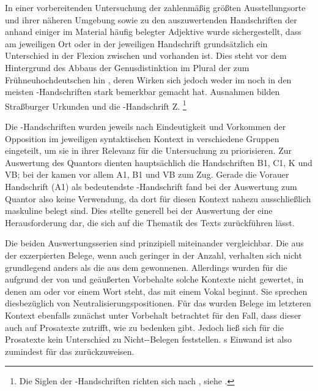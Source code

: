 In einer vorbereitenden Untersuchung der zahlenmäßig größten Ausstellungs\-orte
und ihrer näheren Umgebung sowie zu den auszuwertenden Handschriften der
\KC{} anhand einiger im Material häufig belegter Adjektive wurde
sichergestellt, dass am jeweiligen Ort oder in der jeweiligen Handschrift
grundsätzlich ein Unterschied in der Flexion zwischen  und
 vorhanden ist. Dies steht vor dem Hintergrund des Abbaus der
Genusdistinktion im Plural der  zum
Frühneuhochdeutschen hin
\autocite[191--192]{reichmannwegera1993}, deren Wirken sich jedoch weder im
\CAO{} noch in den meisten \KC-Handschriften stark bemerkbar gemacht hat.
Ausnahmen bilden Straßburger Urkunden und die \KC{}-Handschrift Z.%
%
	\footnote{Die Siglen der \KC-Handschriften richten sich nach
		, siehe .}

Die \KC{}-Handschriften wurden jeweils nach Eindeutigkeit und Vorkommen der
Opposition im jeweiligen syntaktischen Kontext in verschiedene Gruppen
eingeteilt, um sie in ihrer Relevanz für die Untersuchung zu priorisieren. Zur
Auswertung des Quantors  dienten hauptsächlich die Handschriften
B1, C1, K und VB; bei der   kamen vor allem A1, B1
und VB zum Zug. Gerade die Vorauer Handschrift (A1) als bedeutendste
\KC{}-Handschrift fand bei der Auswertung zum Quantor  also keine
Verwendung, da dort für diesen Kontext nahezu ausschließlich maskuline
 belegt sind. Dies stellte generell bei der Auswertung der
\KC{} eine Herausforderung dar, die sich auf die Thematik des Texts
zurückführen lässt.

Die beiden Auswertungsserien sind prinzipiell miteinander vergleichbar. Die aus
der \KC{} exzerpierten Belege, wenn auch geringer in der Anzahl, verhalten sich
nicht grundlegend anders als die aus dem \CAO{} gewonnenen. Allerdings wurden
für die \KC{} aufgrund der von \citet[89--90]{askedal1973} und
\citet[191]{gjelsten1980} geäußerten Vorbehalte solche Kontexte
nicht gewertet, in denen  am  oder vor einem Wort
steht, das mit einem Vokal beginnt. Sie sprechen diesbezüglich von
Neutralisierungs\-positionen. Für das \CAO{} wurden Belege im letzteren Kontext
ebenfalls zunächst unter Vorbehalt betrachtet für den Fall, dass dieser auch
auf Prosatexte zutrifft, wie \citet[92]{askedal1973} zu bedenken
gibt. Jedoch ließ sich für die Prosatexte kein Unterschied zu
Nicht-\allowbreak{}-\allowbreak{}Belegen feststellen.
\citeauthor{askedal1973}s Einwand ist also zumindest für das \CAO{}
zurückzuweisen.

